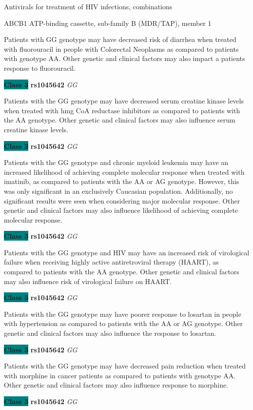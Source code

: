 \documentclass{resume} %
\begin{document}
\begin{rSection}{ Antivirals for treatment of HIV infections, combinations }
\begin{rSubsection}{ ABCB1 }{ ATP-binding cassette, sub-family B (MDR/TAP), member 1 }{}{}
\item[] Patients with GG genotype may have decreased risk of diarrhea when treated with fluorouracil in people with Colorectal Neoplasms as compared to patients with genotype AA. Other genetic and clinical factors may also impact a patients response to fluorouracil.\item \textbf{\colorbox{teal} {Class 3}} \textbf{ rs1045642 } \textit{ GG }
\item[] Patients with the GG genotype may have decreased serum creatine kinase levels when treated with hmg CoA reductase inhibitors as compared to patients with the AA genotype. Other genetic and clinical factors may also influence serum creatine kinase levels. \item \textbf{\colorbox{teal} {Class 3}} \textbf{ rs1045642 } \textit{ GG }
\item[] Patients with the GG genotype and chronic myeloid leukemia may have an increased likelihood of achieving complete molecular response when treated with imatinib, as compared to patients with the AA or AG genotype. However, this was only significant in an exclusively Caucasian population. Additionally, no significant results were seen when considering major molecular response. Other genetic and clinical factors may also influence likelihood of achieving complete molecular response.\item \textbf{\colorbox{teal} {Class 3}} \textbf{ rs1045642 } \textit{ GG }
\item[] Patients with the GG genotype and HIV may have an increased risk of virological failure when receiving highly active antiretroviral therapy (HAART), as compared to patients with the AA genotype. Other genetic and clinical factors may also influence risk of virological failure on HAART.\item \textbf{\colorbox{teal} {Class 3}} \textbf{ rs1045642 } \textit{ GG }
\item[] Patients with the GG genotype may have poorer response to losartan in people with hypertension as compared to patients with the AA or AG genotype. Other genetic and clinical factors may also influence the response to losartan.\item \textbf{\colorbox{teal} {Class 3}} \textbf{ rs1045642 } \textit{ GG }
\item[] Patients with the GG genotype may have decreased pain reduction when treated with morphine in cancer patients as compared to patients with genotype AA. Other genetic and clinical factors may also influence response to morphine.\item \textbf{\colorbox{teal} {Class 3}} \textbf{ rs1045642 } \textit{ GG }

\end{rSubsection}
\end{rSection}
\end{document}
